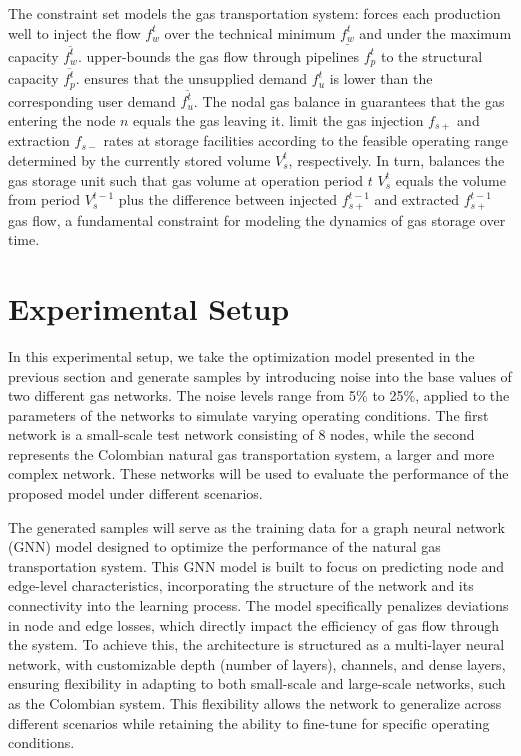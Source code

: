 The constraint set models the gas transportation system:  forces each production well to inject the flow $f_{w}^t$ over the technical minimum $\underline{f_{w}^t}$ and under the maximum capacity $\overline{f_{w}^t}$.  upper-bounds the gas flow through pipelines $f_{p}^t$ to the structural capacity $\overline{f_{p}^t}$.  ensures that the unsupplied demand $f_{u}^{t}$ is lower than the corresponding user demand $\overline{f_{u}^{t}}$. The nodal gas balance in  guarantees that the gas entering the node $n$ equals the gas leaving it.  limit the gas injection $f_{s+}$  and extraction $f_{s-}$ rates at storage facilities according to the feasible operating range determined by the currently stored volume $V_{s}^t$, respectively. In turn,  balances the gas storage unit such that gas volume at operation period $t$ $V_{s}^t$ equals the volume from period $V_{s}^{t-1}$ plus the difference between injected $f_{s+}^{t-1}$ and extracted $f_{s+}^{t-1}$ gas flow, a fundamental constraint for modeling the dynamics of gas storage over time. 

\section{Experimental Setup}


In this experimental setup, we take the optimization model presented in the previous section and generate samples by introducing noise into the base values of two different gas networks. The noise levels range from 5\% to 25\%, applied to the parameters of the networks to simulate varying operating conditions. The first network is a small-scale test network consisting of 8 nodes, while the second represents the Colombian natural gas transportation system, a larger and more complex network. These networks will be used to evaluate the performance of the proposed model under different scenarios.

The generated samples will serve as the training data for a graph neural network (GNN) model designed to optimize the performance of the natural gas transportation system. This GNN model is built to focus on predicting node and edge-level characteristics, incorporating the structure of the network and its connectivity into the learning process. The model specifically penalizes deviations in node and edge losses, which directly impact the efficiency of gas flow through the system. To achieve this, the architecture is structured as a multi-layer neural network, with customizable depth (number of layers), channels, and dense layers, ensuring flexibility in adapting to both small-scale and large-scale networks, such as the Colombian system. This flexibility allows the network to generalize across different scenarios while retaining the ability to fine-tune for specific operating conditions.

